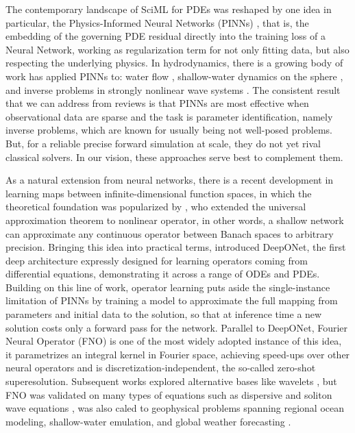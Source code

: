 The contemporary landscape of SciML for PDEs was reshaped by one idea in particular, the Physics-Informed Neural Networks (PINNs) \parencite{raissi2019}, that is, the embedding of the governing PDE residual directly into the training loss of a Neural Network, working as regularization term for not only fitting data, but also respecting the underlying physics. In hydrodynamics, there is a growing body of work has applied PINNs to: water flow \parencite{depina2021, depina2023}, shallow-water dynamics on the sphere \parencite{bihlo2022}, and inverse problems in strongly nonlinear wave systems \parencite{jagtap2022}. The consistent result that we can address from reviews \parencite{cuomo2023} is that PINNs are most effective when observational data are sparse and the task is parameter identification, namely inverse problems, which are known for usually being not well-posed problems. But, for a reliable precise forward simulation at scale, they do not yet rival classical solvers. In our vision, these approaches serve best to complement them.

As a natural extension from neural networks, there is a recent development in learning maps between infinite-dimensional function spaces, in which the theoretical foundation was popularized by \textcite{chen1995}, who extended the universal approximation theorem to nonlinear operator, in other words, a shallow network can approximate any continuous operator between Banach spaces to arbitrary precision. Bringing this idea into practical terms, \textcite{lu2021deeponet} introduced DeepONet, the first deep architecture expressly designed for learning operators coming from differential equations, demonstrating it across a range of ODEs and PDEs. Building on this line of work, operator learning puts aside the single-instance limitation of PINNs by training a model to approximate the full mapping from parameters and initial data to the solution, so that at inference time a new solution costs only a forward pass for the network. Parallel to DeepONet, Fourier Neural Operator (FNO) \parencite{li2021} is one of the most widely adopted instance of this idea, it parametrizes an integral kernel in Fourier space, achieving speed-ups over other neural operators and is discretization-independent, the so-called zero-shot superesolution. Subsequent works explored alternative bases like wavelets \parencite{gupta2021}, but FNO was validated on many types of equations such as dispersive and soliton wave equations \parencite{pei2022, zhong2023}, was also caled to geophysical problems spanning regional ocean modeling, shallow-water emulation, and global weather forecasting \parencite{bonev2023, lkhagvasuren2024, uchida2025, patel2025, yu2025}. 

